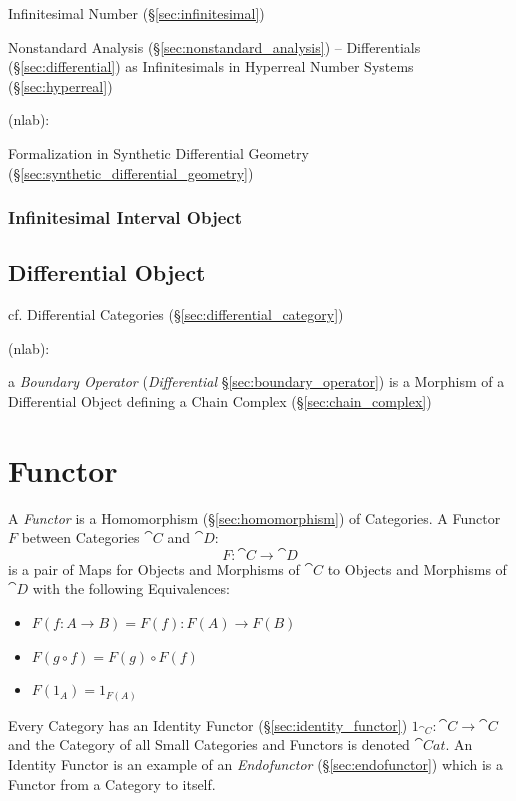 \fist Infinitesimal Number (\S\ref{sec:infinitesimal})

\fist Nonstandard Analysis (\S\ref{sec:nonstandard_analysis}) -- Differentials
(\S\ref{sec:differential}) as Infinitesimals in
Hyperreal Number Systems (\S\ref{sec:hyperreal})

(nlab):

Formalization in Synthetic Differential Geometry
(\S\ref{sec:synthetic_differential_geometry})



\subsubsection{Infinitesimal Interval Object}
\label{sec:infinitesimal_interval_object}



\subsection{Differential Object}\label{sec:differential_object}

\fist cf. Differential Categories (\S\ref{sec:differential_category})

(nlab):

\fist a \emph{Boundary Operator} (\emph{Differential}
\S\ref{sec:boundary_operator}) is a Morphism of a Differential Object defining a
Chain Complex (\S\ref{sec:chain_complex})



\section{Functor}\label{sec:functor}

A \emph{Functor} is a Homomorphism (\S\ref{sec:homomorphism}) of
Categories. A Functor $F$ between Categories $\cat{C}$ and $\cat{D}$:
\[
  F : \cat{C} \rightarrow \cat{D}
\]
is a pair of Maps for Objects and Morphisms of $\cat{C}$ to Objects
and Morphisms of $\cat{D}$ with the following Equivalences:
\begin{itemize}
\item $F(f : A \rightarrow B) = F(f) : F(A) \rightarrow F(B)$
\item $F(g \circ f) = F(g) \circ F(f)$
\item $F(1_A) = 1_{F(A)}$
\end{itemize}
Every Category has an Identity Functor (\S\ref{sec:identity_functor})
$1_{\cat{C}} : \cat{C} \rightarrow \cat{C}$ and the Category
of all Small Categories and Functors is denoted $\cat{Cat}$. An
Identity Functor is an example of an \emph{Endofunctor}
(\S\ref{sec:endofunctor}) which is a Functor from a Category to
itself.

